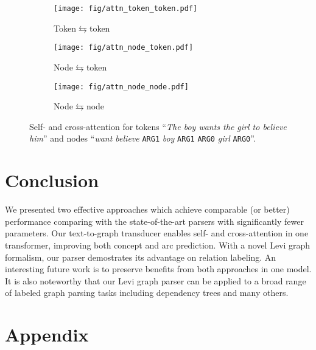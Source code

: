 \documentclass[11pt,a4paper]{article}
\begin{document}
\begin{figure}[htbp!]
 \centering
 \begin{subfigure}[b]{0.3\columnwidth}
     \centering
     \texttt{[image: fig/attn\_token\_token.pdf]}
     \caption{Token{\small $\leftrightarrows$}token }
     \label{fig:attn-token-token}
 \end{subfigure}
 \hfill
 \begin{subfigure}[b]{0.3\columnwidth}
     \centering
     \texttt{[image: fig/attn\_node\_token.pdf]}
     \caption{Node{\small $\leftrightarrows$}token }
     \label{fig:attn-node-token}
 \end{subfigure}
 \hfill
 \begin{subfigure}[b]{0.3\columnwidth}
     \centering
     \texttt{[image: fig/attn\_node\_node.pdf]}
     \caption{Node{\small $\leftrightarrows$}node}
     \label{fig:attn-node-node}
 \end{subfigure}
\caption{Self- and cross-attention for tokens ``\textit{The boy wants the girl to believe him}'' and nodes ``\textit{want believe} \texttt{ARG1} \textit{boy} \texttt{ARG1} \texttt{ARG0} \textit{girl} \texttt{ARG0}''.}
\label{fig:attn}
\vspace{-1.5ex}
\end{figure}





	 \section{Conclusion}
\label{sec:conclusion}

We presented two  effective approaches which achieve comparable (or better) performance comparing with the state-of-the-art parsers with significantly fewer parameters. Our text-to-graph transducer enables self- and cross-attention in one transformer, improving both concept and arc prediction. With a novel Levi graph formalism, our parser demostrates its advantage on relation labeling. An interesting future work is to preserve benefits from both approaches in one model. It is also noteworthy that our Levi graph parser can be applied to a broad range of labeled graph parsing tasks including dependency trees and many others. 



\cleardoublepage\appendix
\section{Appendix}
\label{sec:appendix}
\end{document}
